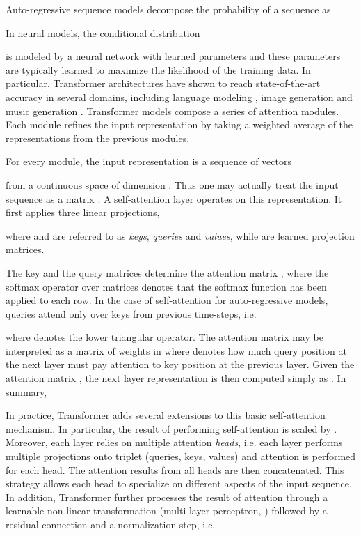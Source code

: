 \documentclass[a4paper]{article}
\begin{document}
Auto-regressive sequence models decompose the probability of 
a sequence  as

In neural models, the conditional distribution 
 
is modeled by a neural network with learned parameters 
and these parameters are typically learned to maximize the 
likelihood of the training data.
In particular, Transformer architectures have shown to reach 
state-of-the-art accuracy in several domains,
including language modeling \citep{vaswani2017attention, radford2018improving}, 
image generation \citep{parmar2018image} and 
music generation \citep{huang2018music}. 
Transformer models compose a series of attention modules. Each module
refines the input representation by taking a weighted average of the 
representations from the previous modules.

For every module, the input representation is a sequence of  vectors

from a continuous space of dimension . Thus one may actually treat 
the input sequence as a  matrix . A self-attention layer
operates on this representation. It first applies three linear projections,

where  and  are referred to as \emph{keys}, \emph{queries} and \emph{values},
while  are learned projection matrices.

The key and the query matrices determine the  
attention matrix ,
where the softmax operator over matrices denotes that the softmax function 
has been applied to each row. 
In the case of self-attention for auto-regressive models, queries attend
only over keys from previous time-steps, i.e. 

where  denotes the lower triangular operator.
The attention matrix  may be interpreted as a matrix of weights 
in  where  denotes how much query position  at the next 
layer must pay attention to key position  at the previous layer. 
Given the attention matrix , the next layer representation  
is then computed simply as . In summary, 

In practice, Transformer \citep{vaswani2017attention} adds several extensions to
this basic self-attention mechanism. 
In particular, the result  of performing self-attention is scaled by
.
Moreover, each layer relies on 
multiple attention \emph{heads}, i.e. each layer performs multiple projections 
onto triplet (queries, keys, values) and attention is performed for each head. 
The attention results from all heads are then concatenated. This strategy allows each 
head 
to specialize on different aspects of the input sequence. In addition, Transformer
further processes the result of attention through a learnable non-linear 
transformation 
(multi-layer perceptron, ) followed by a residual connection and 
a normalization step, i.e.
\end{document}
